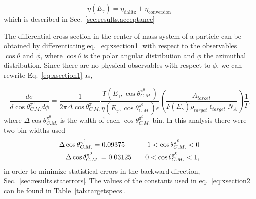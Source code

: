 \begin{equation}\label{eq:xsectionACC}
\eta(E_\gamma) = \eta_{\textrm{dalitz}} + \eta_{\textrm{conversion}}
\end{equation}
which is described in Sec.~\ref{sec:results.acceptance}

The differential cross-section in the center-of-mass system of a particle can be obtained by differentiating eq.~\ref{eq:xsection1} with respect to the observables $\cos\theta$ and $\phi$, where $\cos\theta$ is the polar angular distribution and $\phi$ the azimuthal distribution. Since there are no physical observables with respect to $\phi$, we can rewrite Eq.~\ref{eq:xsection1} as,
 
\begin{equation}\label{eq:xsection2}
\frac{d\sigma}{d\cos\theta^{\pi^0}_{C.M.} d\phi} = \frac{1}{2\pi\Delta\cos\theta^{\pi^0}_{C.M.}} \frac{\Upsilon(E_\gamma,\cos\theta^{\pi^0}_{C.M.})}{\eta(E_\gamma,\cos\theta^{\pi^0}_{C.M.})\epsilon} \left(\frac{A_{target}}{F(E_\gamma) \rho_{target}\ell_{target}N_A}\right)\frac{1}{\Gamma}
\end{equation}
where $\Delta\cos\theta^{\pi^0}_{C.M.}$ is the width of each $\cos\theta^{\pi^0}_{C.M.}$ bin. In this analysis there were two bin widths used
\begin{subequations}

\begin{align}
\Delta\cos\theta^{\pi^0}_{C.M.} = 0.09375 \qquad -1<\cos\theta^{\pi^0}_{C.M.}<0 \label{backbin} \\ \vspace{0.5mm}
\Delta\cos\theta^{\pi^0}_{C.M.} = 0.03125 \qquad 0<\cos\theta^{\pi^0}_{C.M.}<1 \label{frontbin},
\end{align}
\end{subequations}
in order to minimize statistical errors in the backward direction, Sec.~\ref{sec:results.staterrors}. The values of the constants used in eq.~\ref{eq:xsection2} can be found in Table~\ref{tab:targetspecs}.


